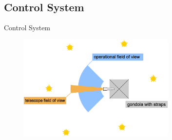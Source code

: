 \documentclass[11pt, aspectratio=169]{beamer}
\begin{document}

\subsection{Control System}
\begin{frame}[t]{Control System}
    \vspace{-0.5cm}
    \begin{figure}
        \centering
        \includegraphics[width=0.7\textwidth]{figures/images/FoV_telescope.eps}
        \label{fig:FoV}
    \end{figure}
\end{frame}

\end{document}
